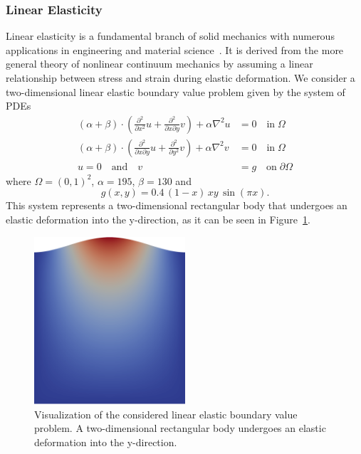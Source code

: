 \subsubsection{Linear Elasticity}
Linear elasticity is a fundamental branch of solid mechanics with numerous applications in engineering and material science~\cite{holzapfel2001nonlinear}.
It is derived from the more general theory of nonlinear continuum mechanics by assuming a linear relationship between stress and strain during elastic deformation.
We consider a two-dimensional linear elastic boundary value problem given by the system of PDEs
\begin{equation}
	\begin{split}
		(\alpha + \beta) \cdot (\frac{\partial^2}{\partial x^2} u + \frac{\partial^2}{\partial x \partial y} v) + \alpha \nabla^2 u & = 0 \quad \text{in} \; \Omega \\
		(\alpha + \beta) \cdot (\frac{\partial^2}{\partial x \partial y} u + \frac{\partial^2}{\partial y^2} v) + \alpha \nabla^2 v & = 0 \quad \text{in} \; \Omega \\
		u = 0 \quad \text{and} \quad v & = g \quad \text{on} \; \partial \Omega 
		\label{eq:linear-elasticity}
	\end{split}
\end{equation}
where $\Omega = (0,1)^2$, $\alpha = 195$, $\beta = 130$ and
\begin{equation*}
	g(x,y) = 0.4 \, (1 - x) \, x y \, \sin(\pi x).
\end{equation*}
This system represents a two-dimensional rectangular body that undergoes an elastic deformation into the y-direction, as it can be seen in Figure~\ref{fig:visualization-linear-elasticity}.
\begin{figure}
	\centering
	\includegraphics[width=0.5\textwidth]{figures/visualization-linear-elasticity1}
	\caption[Visualization of the considered linear elastic boundary value problem]{Visualization of the considered linear elastic boundary value problem. A two-dimensional rectangular body undergoes an elastic deformation into the y-direction.}
	\label{fig:visualization-linear-elasticity}
\end{figure}
